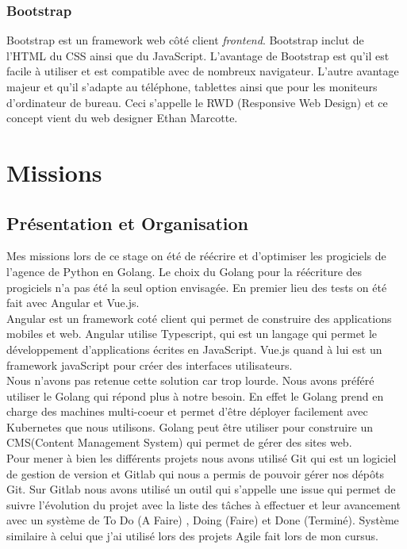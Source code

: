 \documentclass[12pt,a4paper]{report}
\begin{document}
\subsection{Bootstrap}
Bootstrap est un framework web côté client \textit{frontend}. Bootstrap inclut de l'HTML du CSS ainsi que du JavaScript. L'avantage de Bootstrap est qu'il est facile à utiliser et est compatible avec de nombreux navigateur. L'autre avantage majeur et qu'il s'adapte au téléphone, tablettes ainsi que pour les moniteurs d'ordinateur de bureau. Ceci s'appelle le RWD (Responsive Web Design) et ce concept vient du web designer Ethan Marcotte.





\chapter[Missions]{Missions}

\section{Présentation et Organisation}
Mes missions lors de ce stage on été de réécrire et d'optimiser les progiciels de l'agence de Python en Golang. Le choix du Golang pour la réécriture des progiciels n'a pas été la seul option envisagée. En premier lieu des tests on été fait avec Angular et Vue.js.\\ 

Angular est un framework coté client qui permet de construire des applications mobiles et web. Angular utilise Typescript, qui est un langage qui permet le développement d'applications écrites en JavaScript. Vue.js quand à lui est un framework javaScript pour créer des interfaces utilisateurs.\\

Nous n'avons pas retenue cette solution car trop lourde. Nous avons préféré utiliser le Golang qui répond plus à notre besoin. En effet le Golang prend en charge des machines multi-coeur et permet d'être déployer facilement avec Kubernetes que nous utilisons. Golang peut être utiliser pour construire un CMS(Content Management System) qui permet de gérer des sites web.\\

Pour mener à bien les différents projets nous avons utilisé Git qui est un logiciel de gestion de version et Gitlab qui nous a permis de pouvoir gérer nos dépôts Git. Sur Gitlab nous avons utilisé un outil qui s'appelle une issue qui permet de suivre l'évolution du projet avec la liste des tâches à effectuer et leur avancement avec un système de To Do (A Faire) , Doing (Faire) et Done (Terminé). Système similaire à celui que j'ai utilisé lors des projets Agile fait lors de mon cursus.\\
\end{document}
